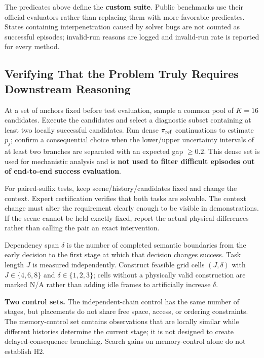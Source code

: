 \documentclass[
  10pt,
]{article}
\begin{document}
The predicates above define the \textbf{custom suite}. Public benchmarks use their official evaluators rather than replacing them with more favorable predicates. States containing interpenetration caused by solver bugs are not counted as successful episodes; invalid-run reasons are logged and invalid-run rate is reported for every method.

\hypertarget{kiux1ec3m-tra-rux1eb1ng-buxe0i-touxe1n-thux1ef1c-sux1ef1-cux1ea7n-downstream-reasoning}{%
\subsection{Verifying That the Problem Truly Requires Downstream Reasoning}\label{kiux1ec3m-tra-rux1eb1ng-buxe0i-touxe1n-thux1ef1c-sux1ef1-cux1ea7n-downstream-reasoning}}

At a set of anchors fixed before test evaluation, sample a common pool of \(K=16\) candidates. Execute the candidates and select a diagnostic subset containing at least two locally successful candidates. Run dense \(\pi_{\rm ref}\) continuations to estimate \(p_j\); confirm a consequential choice when the lower/upper uncertainty intervals of at least two branches are separated with an expected gap \(\geq0.2\). This dense set is used for mechanistic analysis and is \textbf{not used to filter difficult episodes out of end-to-end success evaluation}.

For paired-suffix tests, keep scene/history/candidates fixed and change the context. Expert certification verifies that both tasks are solvable. The context change must alter the requirement clearly enough to be visible in demonstrations. If the scene cannot be held exactly fixed, report the actual physical differences rather than calling the pair an exact intervention.

Dependency span \(\delta\) is the number of completed semantic boundaries from the early decision to the first stage at which that decision changes success. Task length \(J\) is measured independently. Construct feasible grid cells \((J,\delta)\) with \(J\in\{4,6,8\}\) and \(\delta\in\{1,2,3\}\); cells without a physically valid construction are marked N/A rather than adding idle frames to artificially increase \(\delta\).

\textbf{Two control sets.} The independent-chain control has the same number of stages, but placements do not share free space, access, or ordering constraints. The memory-control set contains observations that are locally similar while different histories determine the current stage; it is not designed to create delayed-consequence branching. Search gains on memory-control alone do not establish H2.
\end{document}
